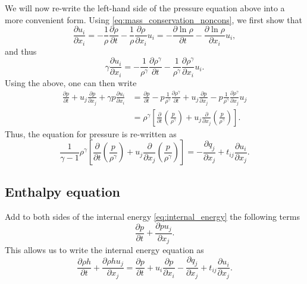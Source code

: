 \documentclass[oneside,a4paper,11pt]{report}
\begin{document}
We will now re-write the left-hand side of the pressure equation above into a more convenient form. Using \cref{eq:mass_conservation_noncons}, we first show that
\begin{equation}
    \frac{\partial u_i}{\partial x_i} = -\frac{1}{\rho} \frac{\partial \rho}{\partial t} - \frac{1}{\rho} \frac{\partial \rho}{\partial x_i}u_i = - \frac{\partial \ln{\rho} }{\partial t} -  \frac{\partial \ln{\rho}}{\partial x_i} u_i,
\end{equation}
and thus
\begin{equation}
    \gamma \frac{\partial u_i}{\partial x_i} = -\frac{1}{\rho^\gamma} \frac{\partial \rho^\gamma}{\partial t} - \frac{1}{\rho^\gamma} \frac{\partial \rho^\gamma}{\partial x_i} u_i.
\end{equation}
Using the above, one can then write
\begin{align}
    \frac{\partial p}{\partial t} + u_j\frac{\partial p}{\partial x_j} +\gamma p \frac{\partial u_i}{\partial x_i} 
    &= \frac{\partial p}{\partial t} - p \frac{1}{\rho^\gamma} \frac{\partial \rho^\gamma}{\partial t} + u_j \frac{\partial p}{\partial x_j} - p \frac{1}{\rho^\gamma} \frac{\partial \rho^\gamma}{\partial x_j} u_j \nonumber \\
    & = \rho^\gamma \left [ \frac{\partial}{\partial t} \left ( \frac{p}{\rho^\gamma} \right) + u_j \frac{\partial}{\partial x_j} \left (\frac{p}{\rho^\gamma} \right ) \right ].
\end{align}
Thus, the equation for pressure is re-written as
\begin{equation}
\label{eq:energy_form_pressure_2}
    \frac{1}{\gamma - 1} \rho^\gamma \left [ \frac{\partial}{\partial t} \left ( \frac{p}{\rho^\gamma} \right) + u_j \frac{\partial}{\partial x_j} \left (\frac{p}{\rho^\gamma} \right ) \right ] = -\frac{\partial q_j}{\partial x_j} + t_{ij} \frac{\partial u_i}{\partial x_j}.
\end{equation}
\subsection{Enthalpy equation} 
Add to both sides of the internal energy \cref{eq:internal_energy} the following terms
\begin{equation}
    \frac{\partial p}{\partial t} + \frac{\partial p u_j}{\partial x_j}.
\end{equation}
This allows us to write the internal energy equation as
\begin{equation}
\label{eq:energy_form_enthalpy}
\frac{ \partial \rho h}{\partial t} + \frac{\partial \rho h u_j}{\partial x_j} =  \frac{\partial p}{\partial t} + u_i \frac{\partial p}{\partial x_i} - \frac{\partial q_j}{\partial x_j} + t_{ij} \frac{\partial u_i}{\partial x_j}.
\end{equation}
\end{document}

